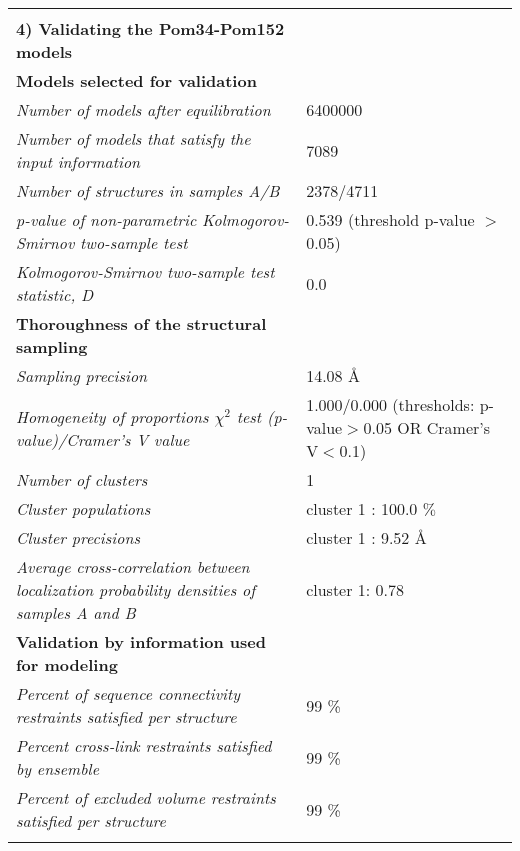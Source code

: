 \documentclass[11pt,a4paper]{article}
\begin{document}
\begin{landscape}
\begin{longtable}{ p{} | p{} }
   &  \\

  \normalsize{\textbf{4) Validating the Pom34-Pom152 models}} & \\
    \hline
   \textbf{Models selected for validation} & \\
    \hline
          \textit{Number of models after equilibration} & 6400000\\
                \textit{Number of models that satisfy the input information} & 7089\\
                \textit{Number of structures in samples A/B} & 2378/4711\\
                \textit{p-value of non-parametric Kolmogorov-Smirnov two-sample test} & 0.539 (threshold p-value $>$ 0.05)\\
                \textit{Kolmogorov-Smirnov two-sample test statistic, D} & 0.0\\
           \hline
    
    \textbf{Thoroughness of the structural sampling} & \\
    \hline
          \textit{Sampling precision} & 14.08 \AA \\
                \textit{Homogeneity of proportions $\chi^2$ test (p-value)/Cramer’s V value} & 1.000/0.000 (thresholds: p-value$>$0.05 OR Cramer's V$<$0.1)\\
                \textit{Number of clusters} & 1\\
                \textit{Cluster populations} & cluster 1 : 100.0 $\%$\\
                \textit{Cluster precisions} & cluster 1 : 9.52 \AA\\
                \textit{Average cross-correlation between localization probability densities of samples A and B} & cluster 1: 0.78\\
           \hline
  
  \textbf{Validation by information used for modeling} & \\
  \hline
          \textit{Percent of sequence connectivity restraints satisfied per structure} & 99 \%\\
                \textit{Percent cross-link restraints satisfied by ensemble} & 99 \%\\
                \textit{Percent of excluded volume restraints satisfied per structure} & 99 \%\\
          &  \\
  

\end{longtable}
\end{landscape}
\end{document}
